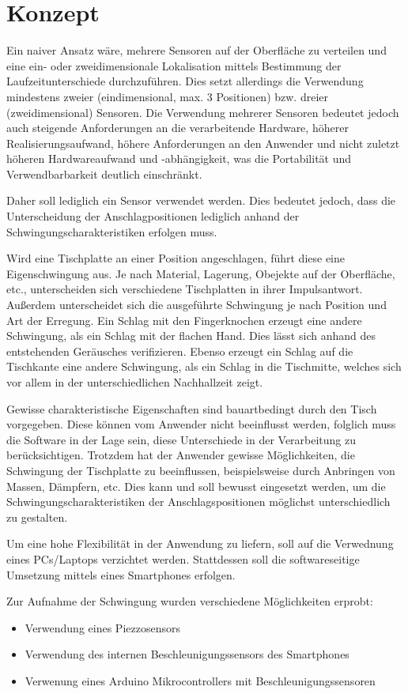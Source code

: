 \section{Konzept}
\label{sec:Konzept}
Ein naiver Ansatz wäre, mehrere Sensoren auf der Oberfläche zu verteilen und eine ein- oder zweidimensionale Lokalisation mittels Bestimmung der Laufzeitunterschiede durchzuführen.
Dies setzt allerdings die Verwendung mindestens zweier (eindimensional, max. 3 Positionen) bzw. dreier (zweidimensional) Sensoren. 
Die Verwendung mehrerer Sensoren bedeutet jedoch auch steigende Anforderungen an die verarbeitende Hardware, höherer Realisierungsaufwand, höhere Anforderungen an den Anwender und nicht zuletzt höheren Hardwareaufwand und -abhängigkeit, was die Portabilität und Verwendbarbarkeit deutlich einschränkt.

Daher soll lediglich ein Sensor verwendet werden. Dies bedeutet jedoch, dass die Unterscheidung der Anschlagpositionen lediglich anhand der Schwingungscharakteristiken erfolgen muss.

Wird eine Tischplatte an einer Position angeschlagen, führt diese eine Eigenschwingung aus.
Je nach Material, Lagerung, Obejekte auf der Oberfläche, etc., unterscheiden sich verschiedene Tischplatten in ihrer Impulsantwort.
Außerdem unterscheidet sich die ausgeführte Schwingung je nach Position und Art der Erregung.
Ein Schlag mit den Fingerknochen erzeugt eine andere Schwingung, als ein Schlag mit der flachen Hand.
Dies lässt sich anhand des entstehenden Geräusches verifizieren.
Ebenso erzeugt ein Schlag auf die Tischkante eine andere Schwingung, als ein Schlag in die Tischmitte, welches sich vor allem in der unterschiedlichen Nachhallzeit zeigt.

Gewisse charakteristische Eigenschaften sind bauartbedingt durch den Tisch vorgegeben. 
Diese können vom Anwender nicht beeinflusst werden, folglich muss die Software in der Lage sein, diese Unterschiede in der Verarbeitung zu berücksichtigen. 
Trotzdem hat der Anwender gewisse Möglichkeiten, die Schwingung der Tischplatte zu beeinflussen, beispielsweise durch Anbringen von Massen, Dämpfern, etc.
Dies kann und soll bewusst eingesetzt werden, um die Schwingungscharakteristiken der Anschlagspositionen möglichst unterschiedlich zu gestalten.  

Um eine hohe Flexibilität in der Anwendung zu liefern, soll auf die Verwednung eines PCs/Laptops verzichtet werden. Stattdessen soll die softwareseitige Umsetzung mittels eines Smartphones erfolgen.

Zur Aufnahme der Schwingung wurden verschiedene Möglichkeiten erprobt:
\begin{itemize}
	\item Verwendung eines Piezzosensors
	\item Verwendung des internen Beschleunigungssensors des Smartphones
	\item Verwenung eines Arduino Mikrocontrollers mit Beschleunigungssensoren  
\end{itemize}

